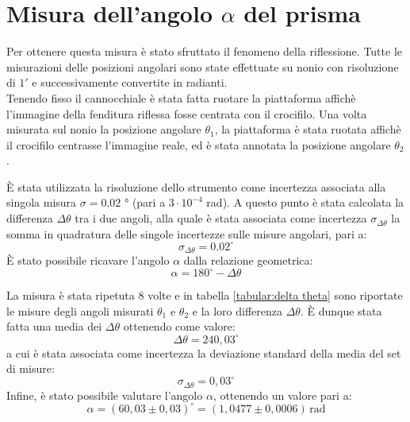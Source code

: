 \documentclass{article}
\begin{document}
    \section{Misura dell'angolo $\alpha$ del prisma}

        Per ottenere questa misura è stato sfruttato il fenomeno della riflessione. Tutte le misurazioni delle posizioni angolari sono state effettuate
        su nonio con risoluzione di $1'$ e  successivamente  convertite in radianti. \\
        Tenendo fisso il cannocchiale è stata fatta ruotare la piattaforma affichè l'immagine della fenditura riflessa fosse centrata 
        con il crocifilo. Una volta misurata sul nonio la posizione angolare $\theta_1$, la piattaforma è stata ruotata affichè il crocifilo 
        centrasse l'immagine reale, ed è stata annotata la posizione angolare $\theta_2$.
        
        È stata utilizzata la risoluzione dello strumento come incertezza associata alla singola misura $\sigma = 0.02$ ° (pari a $3 \cdot 10^{-4}$ rad). 
        A questo punto è stata calcolata la differenza $\Delta\theta$ tra i due angoli, alla quale è stata associata come incertezza $\sigma_{\Delta\theta}$ 
        la somma in quadratura delle singole incertezze sulle misure angolari, pari a: \[ \sigma_{\Delta\theta} = 0.02 ^\circ \]
        È stato possibile ricavare l'angolo $\alpha$ dalla relazione geometrica: \[ \alpha = 180 ^\circ - \Delta\theta \]

        La misura è stata ripetuta 8 volte e in tabella \ref{tabular:delta theta} sono riportate le misure degli angoli misurati $\theta_1$ e $\theta_2$ 
        e la loro differenza $\Delta\theta$. È dunque stata fatta una media dei $\Delta\theta$ ottenendo come valore:
        \[ \Delta\theta = 240,03^\circ \] a cui è stata associata come incertezza la deviazione standard della media del set di misure:
        \[ \sigma_{\Delta\theta} = 0,03^\circ \]
        Infine, è stato possibile valutare l'angolo $\alpha$, ottenendo un valore pari a: 
        \[\alpha = (60,03\pm 0,03)^\circ = (1,0477\pm 0,0006)\, \mathrm{rad}\]
\end{document}
